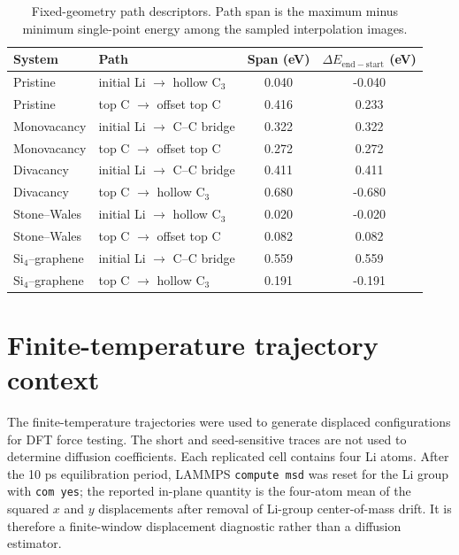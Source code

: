 \documentclass[11pt]{article}
\begin{document}
\begin{table}[H]
  \centering
  \footnotesize
  \caption{Fixed-geometry path descriptors. Path span is the maximum minus
  minimum single-point energy among the sampled interpolation images.}
  \label{tab:si_path_scans}
  \begin{tabular}{llcc}
    \toprule
    System & Path & Span (eV) & $\Delta E_{\mathrm{end-start}}$ (eV) \\
    \midrule
    Pristine & initial Li $\rightarrow$ hollow C$_3$ & 0.040 & -0.040 \\
    Pristine & top C $\rightarrow$ offset top C & 0.416 & 0.233 \\
    Monovacancy & initial Li $\rightarrow$ C--C bridge & 0.322 & 0.322 \\
    Monovacancy & top C $\rightarrow$ offset top C & 0.272 & 0.272 \\
    Divacancy & initial Li $\rightarrow$ C--C bridge & 0.411 & 0.411 \\
    Divacancy & top C $\rightarrow$ hollow C$_3$ & 0.680 & -0.680 \\
    Stone--Wales & initial Li $\rightarrow$ hollow C$_3$ & 0.020 & -0.020 \\
    Stone--Wales & top C $\rightarrow$ offset top C & 0.082 & 0.082 \\
    Si$_4$--graphene & initial Li $\rightarrow$ C--C bridge & 0.559 & 0.559 \\
    Si$_4$--graphene & top C $\rightarrow$ hollow C$_3$ & 0.191 & -0.191 \\
    \bottomrule
  \end{tabular}
\end{table}

\clearpage
\section{Finite-temperature trajectory context}

The finite-temperature trajectories were used to generate displaced
configurations for DFT force testing. The short and seed-sensitive traces are
not used to determine diffusion coefficients. Each replicated cell contains
four Li atoms. After the 10 ps equilibration period, LAMMPS
\texttt{compute msd} was reset for the Li group with \texttt{com yes}; the
reported in-plane quantity is the four-atom mean of the squared $x$ and $y$
displacements after removal of Li-group center-of-mass drift. It is therefore a
finite-window displacement diagnostic rather than a diffusion estimator.
\end{document}

